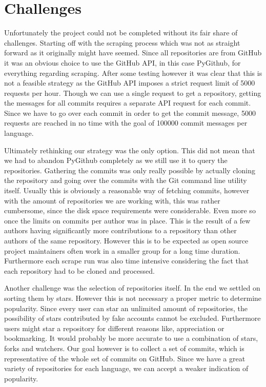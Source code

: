 \section{Challenges}
\label{sec:challenges}

Unfortunately the project could not be completed without its fair share of
challenges. Starting off with the scraping process which was not as straight
forward as it originally might have seemed. Since all repositories are from
GitHub it was an obvious choice to use the GitHub API, in this case PyGithub,
for everything regarding scraping. After some testing however it was clear that
this is not a feasible strategy as the GitHub API imposes a strict request
limit of 5000 requests per hour. Though we can use a single request to get a
repository, getting the messages for all commits requires a separate API
request for each commit. Since we have to go over each commit in
order to get the commit message, 5000 requests are reached in no time with the
goal of 100000 commit messages per language.

Ultimately rethinking our strategy was the only option. This did not mean that
we had to abandon PyGithub completely as we still use it to query the
repositories. Gathering the commits was only really possible by actually
cloning the repository and going over the commits with the Git command line utility
itself. Usually this is obviously a reasonable way of fetching commits, however
with the amount of repositories we are working with, this was rather cumbersome,
since the disk space requirements were considerable. Even more so once the
limits on commits per author was in place. This is the result of a few authors
having significantly more contributions to a repository than other authors of the
same repository. However this is to be expected as open source project
maintainers often work in a smaller group for a long time duration. Furthermore
each scrape run was also time intensive considering the fact that each
repository had to be cloned and processed.

Another challenge was the selection of repositories itself. In the end we settled
on sorting them by stars. However this is not necessary a proper metric to
determine popularity. Since every user can star an unlimited amount of
repositories, the possibility of stars contributed by fake accounts cannot be
excluded. Furthermore users might star a repository for different reasons like,
appreciation or bookmarking. It would probably be more accurate to use a
combination of stars, forks and watchers. Our goal however is to collect a set
of commits, which is representative of the whole set of commits on GitHub.
Since we have a great variety of repositories for each language, we can
accept a weaker indication of popularity.
